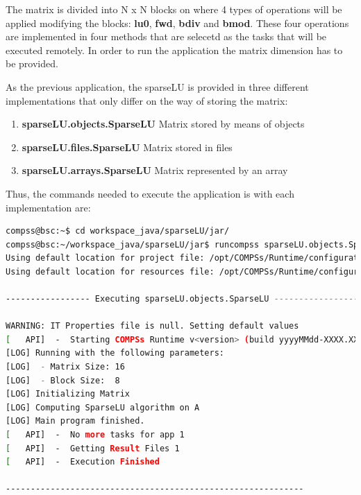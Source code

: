 The matrix is divided into N x N blocks on where 4 types of operations will be applied modifying the blocks: 
{\bf lu0}, {\bf fwd}, {\bf bdiv} and {\bf bmod}. These four operations are implemented in four methods that 
are selecetd as the tasks that will be executed remotely. In order to run the application the matrix dimension 
has to be provided.

As the previous application, the sparseLU is provided in three different implementations that only differ on the way of storing
the matrix:
\begin{enumerate}
 \item \textbf{sparseLU.objects.SparseLU} Matrix stored by means of objects
 \item \textbf{sparseLU.files.SparseLU} Matrix stored in files
 \item \textbf{sparseLU.arrays.SparseLU} Matrix represented by an array
\end{enumerate}

Thus, the commands needed to execute the application is with each implementation are:

\begin{lstlisting}[language=bash]
compss@bsc:~$ cd workspace_java/sparseLU/jar/
compss@bsc:~/workspace_java/sparseLU/jar$ runcompss sparseLU.objects.SparseLU 16 8
Using default location for project file: /opt/COMPSs/Runtime/configuration/xml/projects/project.xml
Using default location for resources file: /opt/COMPSs/Runtime/configuration/xml/resources/resources.xml

----------------- Executing sparseLU.objects.SparseLU --------------------------

WARNING: IT Properties file is null. Setting default values
[   API]  -  Starting COMPSs Runtime v<version> (build yyyyMMdd-XXXX.XXXX)
[LOG] Running with the following parameters:
[LOG]  - Matrix Size: 16
[LOG]  - Block Size:  8
[LOG] Initializing Matrix
[LOG] Computing SparseLU algorithm on A
[LOG] Main program finished.
[   API]  -  No more tasks for app 1
[   API]  -  Getting Result Files 1
[   API]  -  Execution Finished

------------------------------------------------------------
\end{lstlisting}

